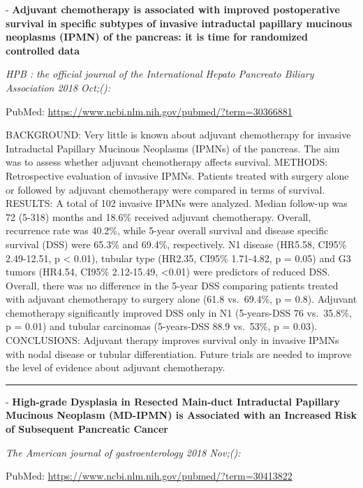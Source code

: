 \documentclass[]{article}
\begin{document}
 - \textbf{Adjuvant chemotherapy is associated with improved
postoperative survival in specific subtypes of invasive intraductal
papillary mucinous neoplasms (IPMN) of the pancreas: it is time for
randomized controlled data}

\emph{HPB : the official journal of the International Hepato Pancreato
Biliary Association 2018 Oct;():}

PubMed: \url{https://www.ncbi.nlm.nih.gov/pubmed/?term=30366881}

BACKGROUND: Very little is known about adjuvant chemotherapy for
invasive Intraductal Papillary Mucinous Neoplasms (IPMNs) of the
pancreas. The aim was to assess whether adjuvant chemotherapy affects
survival. METHODS: Retrospective evaluation of invasive IPMNs. Patients
treated with surgery alone or followed by adjuvant chemotherapy were
compared in terms of survival. RESULTS: A total of 102 invasive IPMNs
were analyzed. Median follow-up was 72 (5-318) months and 18.6\%
received adjuvant chemotherapy. Overall, recurrence rate was 40.2\%,
while 5-year overall survival and disease specific survival (DSS) were
65.3\% and 69.4\%, respectively. N1 disease (HR5.58, CI95\% 2.49-12.51,
p \textless{} 0.01), tubular type (HR2.35, CI95\% 1.71-4.82, p = 0.05)
and G3 tumors (HR4.54, CI95\% 2.12-15.49, \textless{}0.01) were
predictors of reduced DSS. Overall, there was no difference in the
5-year DSS comparing patients treated with adjuvant chemotherapy to
surgery alone (61.8 vs.~69.4\%, p = 0.8). Adjuvant chemotherapy
significantly improved DSS only in N1 (5-years-DSS 76 vs.~35.8\%, p =
0.01) and tubular carcinomas (5-years-DSS 88.9 vs.~53\%, p = 0.03).
CONCLUSIONS: Adjuvant therapy improves survival only in invasive IPMNs
with nodal disease or tubular differentiation. Future trials are needed
to improve the level of evidence about adjuvant chemotherapy.

{}

{}

\begin{center}\rule{0.5\linewidth}{\linethickness}\end{center}

 - \textbf{High-grade Dysplasia in Resected Main-duct Intraductal
Papillary Mucinous Neoplasm (MD-IPMN) is Associated with an Increased
Risk of Subsequent Pancreatic Cancer}

\emph{The American journal of gastroenterology 2018 Nov;():}

PubMed: \url{https://www.ncbi.nlm.nih.gov/pubmed/?term=30413822}
\end{document}
